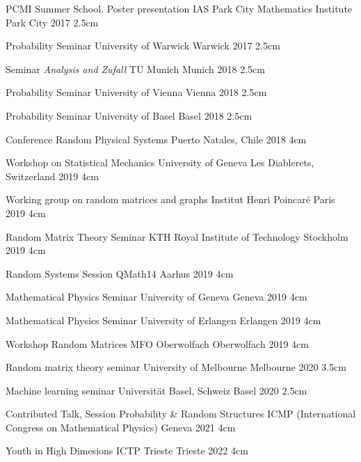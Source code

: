 \documentclass[11pt, a4paper]{awesome-cv}
\begin{document}
\begin{cventries}
  \cventry
    {PCMI Summer School. Poster presentation}
    {IAS Park City Mathematics Institute}
    {Park City}
    {2017}
    {}
    {2.5cm}

  \cventry
    {Probability Seminar}
    {University of Warwick}
    {Warwick}
    {2017}
    {}
    {2.5cm}

  \cventry
    {Seminar \emph{Analysis and Zufall}}
    {TU Munich}
    {Munich}
    {2018}
    {}
    {2.5cm}

  \cventry
    {Probability Seminar}
    {University of Vienna}
    {Vienna}
    {2018}
    {}
    {2.5cm}

  \cventry
    {Probability Seminar}
    {University of Basel}
    {Basel}
    {2018}
    {}
    {2.5cm}

  \cventry
    {Conference}
    {Random Physical Systems}
    {Puerto Natales, Chile}
    {2018}
    {}
    {4cm}

  \cventry
    {Workshop on Statistical Mechanics}
    {University of Geneva}
    {Les Diablerets, Switzerland}
    {2019}
    {}
    {4cm}

  \cventry
    {Working group on random matrices and graphs}
    {Institut Henri Poincaré}
    {Paris}
    {2019}
    {}
    {4cm}

  \cventry
    {Random Matrix Theory Seminar}
    {KTH Royal Institute of Technology}
    {Stockholm}
    {2019}
    {}
    {4cm}

  \cventry
    {Random Systems Session}
    {QMath14}
    {Aarhus}
    {2019}
    {}
    {4cm}

\cventry
    {Mathematical Physics Seminar}
    {University of Geneva}
    {Geneva}
    {2019}
    {}
    {4cm}

  \cventry
    {Mathematical Physics Seminar}
    {University of Erlangen}
    {Erlangen}
    {2019}
    {}
    {4cm}
  
  \cventry
    {Workshop Random Matrices}
    {MFO Oberwolfach}
    {Oberwolfach}
    {2019}
    {}
    {4cm}

    \cventry
    {Random matrix theory seminar}
    {University of Melbourne}
    {Melbourne}
    {2020}
    {}
    {3.5cm}

 \cventry
    {Machine learning seminar}
    {Universität Basel, Schweiz}
    {Basel}
    {2020}
    {}
    {2.5cm}

  \cventry
    {Contributed Talk, Session Probability \& Random Structures}
    {ICMP (International Congress on Mathematical Physics)}
    {Geneva}
    {2021}
    {}
    {4cm}

  \cventry
    {Youth in High Dimesions}
    {ICTP Trieste}
    {Trieste}
    {2022}
    {}
    {4cm}
\end{cventries}
\end{document}
